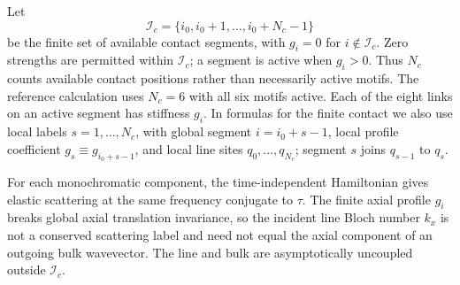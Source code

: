 \documentclass[10pt,aps,onecolumn,floatfix,notitlepage,nofootinbib,showkeys]{revtex4-2}
\newcommand{\Ic}{\mathcal I_c}
\begin{document}
Let
\begin{equation}
  \Ic=\{i_0,i_0+1,\ldots,i_0+N_c-1\}
  \label{eq:s2-active-set}
\end{equation}
be the finite set of available contact segments, with $g_i=0$ for $i\notin\Ic$. Zero strengths are permitted within $\Ic$; a segment is active when $g_i>0$. Thus $N_c$ counts available contact positions rather than necessarily active motifs. The reference calculation uses $N_c=6$ with all six motifs active. Each of the eight links on an active segment has stiffness $g_i$. In formulas for the finite contact we also use local labels $s=1,\ldots,N_c$, with global segment $i=i_0+s-1$, local profile coefficient $g_s\equiv g_{i_0+s-1}$, and local line sites $q_0,\ldots,q_{N_c}$; segment $s$ joins $q_{s-1}$ to $q_s$.

For each monochromatic component, the time-independent Hamiltonian gives elastic scattering at the same frequency conjugate to $\tau$. The finite axial profile $g_i$ breaks global axial translation invariance, so the incident line Bloch number $k_x$ is not a conserved scattering label and need not equal the axial component of an outgoing bulk wavevector. The line and bulk are asymptotically uncoupled outside $\Ic$.
\end{document}
